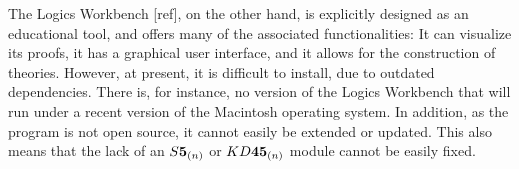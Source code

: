 The Logics Workbench [ref], on the other hand, is explicitly designed as an educational tool, and offers many of the associated functionalities: It can visualize its proofs, it has a graphical user interface, and it allows for the construction of theories. However, at present, it is difficult to install, due to outdated dependencies. There is, for instance, no version of the Logics Workbench that will run under a recent version of the Macintosh operating system. In addition, as the program is not open source, it cannot easily be extended or updated. This also means that the lack of an $\mathbf\mathit{S}\textbf{5}_{(n)}$ or $\mathbf\mathit{KD}\textbf{45}_{(n)}$ module cannot be easily fixed.
